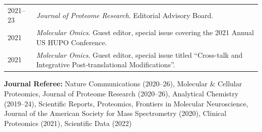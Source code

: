 \documentclass[11pt]{article}
\begin{document}

{}

\begin{longtable}{V}
  2021--23 & \textit{Journal of Proteome Research}. Editorial Advisory Board. \\
  2021 & \textit{Molecular Omics}. Guest editor, special issue covering the 2021 Annual US HUPO Conference. \\
  2021 & \textit{Molecular Omics}. Guest editor, special issue titled ``Cross-talk and Integrative Post-translational Modifications''. \\
\end{longtable}

{\bf Journal Referee: }{Nature Communications (2020--26), Molecular \& Cellular Proteomics, Journal of Proteome Research (2020--26), Analytical Chemistry (2019--24), Scientific Reports, Proteomics, Frontiers in Molecular Neuroscience, Journal of the American Society for Mass Spectrometry (2020), Clinical Proteomics (2021), Scientific Data (2022)}
\end{document}

